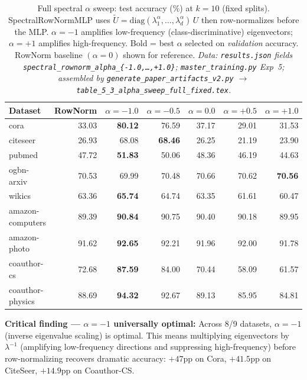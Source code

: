\documentclass[11pt]{article}
\begin{document}
\begin{table}[H]
\centering\small\setlength{\tabcolsep}{4pt}
\caption{Full spectral $\alpha$ sweep: test accuracy (\%) at $k{=}10$ (fixed splits).
SpectralRowNormMLP uses $\tilde{U} = \mathrm{diag}(\lambda_1^\alpha,\ldots,\lambda_d^\alpha)\,U$
then row-normalizes before the MLP.  $\alpha{=}-1$ amplifies low-frequency (class-discriminative)
eigenvectors; $\alpha{=}+1$ amplifies high-frequency.
Bold = best $\alpha$ selected on \emph{validation} accuracy.
RowNorm baseline $(\alpha{=}0)$ shown for reference.
\textit{\scriptsize Data: \texttt{results.json} fields \texttt{spectral\_rownorm\_alpha\_\{-1.0,\ldots,+1.0\}};
\texttt{master\_training.py} Exp~5;
assembled by \texttt{generate\_paper\_artifacts\_v2.py} $\to$ \texttt{table\_5\_3\_alpha\_sweep\_full\_fixed.tex}.}}
\label{tab:alpha_sweep_full_fixed}
\begin{tabular}{lrrrrrr}
\toprule
Dataset & RowNorm & $\alpha{=}-1.0$ & $\alpha{=}-0.5$ & $\alpha{=}0.0$ & $\alpha{=}+0.5$ & $\alpha{=}+1.0$ \\
\midrule
cora             & 33.03 & \textbf{80.12} & 76.59 & 37.17 & 29.01 & 31.53 \\
citeseer         & 26.93 & 68.08 & \textbf{68.46} & 26.25 & 21.19 & 23.90 \\
pubmed           & 47.72 & \textbf{51.83} & 50.06 & 48.36 & 46.19 & 44.63 \\
ogbn-arxiv       & 70.53 & 69.99 & 70.48 & 70.66 & 70.62 & \textbf{70.56} \\
wikics           & 63.36 & \textbf{65.74} & 64.74 & 63.35 & 61.61 & 60.47 \\
amazon-computers & 89.39 & \textbf{90.84} & 90.75 & 90.40 & 90.18 & 89.95 \\
amazon-photo     & 91.62 & \textbf{92.65} & 92.21 & 91.96 & 92.00 & 91.78 \\
coauthor-cs      & 72.68 & \textbf{87.59} & 84.00 & 70.44 & 58.09 & 61.57 \\
coauthor-physics & 88.69 & \textbf{94.32} & 92.67 & 89.13 & 85.95 & 84.81 \\
\bottomrule
\end{tabular}
\end{table}

\noindent\textbf{Critical finding --- $\alpha = -1$ universally optimal:}
Across 8/9 datasets, $\alpha{=}-1$ (inverse eigenvalue scaling) is optimal.  This means
multiplying eigenvectors by $\lambda^{-1}$ (amplifying low-frequency directions and
suppressing high-frequency) before row-normalizing recovers dramatic accuracy:
$+47$pp on Cora, $+41.5$pp on CiteSeer, $+14.9$pp on Coauthor-CS.
\end{document}
